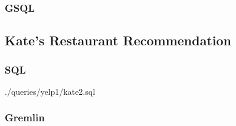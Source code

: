 \subsubsection{GSQL}



\subsection{Kate's Restaurant Recommendation}

\subsubsection{SQL}






{./queries/yelp1/kate2.sql}


\subsubsection{Gremlin}


